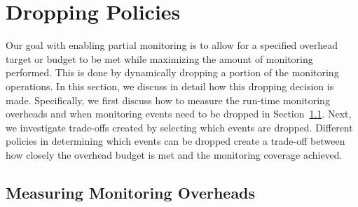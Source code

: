 \section{Dropping Policies}
\label{sec:policies}

Our goal with enabling partial monitoring is to allow for a specified overhead target or budget to be met while maximizing the amount of monitoring performed.
This is done by dynamically dropping a portion of the monitoring operations. In this section, we discuss in detail how this dropping decision is
made. Specifically, we first discuss how to measure the run-time monitoring
overheads and when monitoring events need to be dropped in
Section~\ref{sec:policies.slack}. Next, we investigate trade-offs created by
selecting which events are dropped. Different policies in determining which
events can be dropped create a trade-off between how closely the overhead
budget is met and the monitoring coverage achieved.

\subsection{Measuring Monitoring Overheads}
\label{sec:policies.slack}

